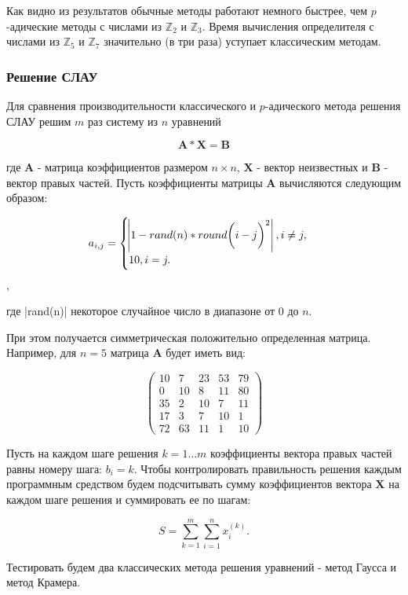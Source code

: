 \documentclass[master, och, diploma, times]{sty/SCWorks}
\theoremstyle{plain}
\theoremstyle{definition}
\begin{document}
Как видно из результатов обычные методы работают немного быстрее, чем $p$-адические методы с числами из $\mathbb{Z}_2$ и $\mathbb{Z}_3$. Время вычисления определителя с числами из $\mathbb{Z}_5$ и $\mathbb{Z}_7$ значительно (в три раза) уступает классическим методам.


\subsubsection{Решение СЛАУ}
Для сравнения производительности классического и $p$-адического метода решения СЛАУ решим $m$ раз систему из $n$ уравнений 

$$
\boldsymbol{A}*\boldsymbol{X}=\boldsymbol{B}
$$

\noindent где $\boldsymbol{A}$ - матрица коэффициентов размером $n \times n$, $\boldsymbol{X}$ - вектор неизвестных и $\boldsymbol{B}$ - вектор правых частей.
Пусть коэффициенты матрицы $\boldsymbol{A}$ вычисляются следующим образом:

$$
a_{i,j}= 
\begin{cases} 
\abs{1-rand(n)*round\bigg(i-j\bigg)^2}, i \neq j, \\ 
10, i = j.
\end{cases}
$$,

\noindent где |rand(n)| некоторое случайное число в диапазоне от $0$ до $n$.

При этом получается симметрическая положительно определенная матрица.
Например, для $n=5$ матрица $\boldsymbol{A}$ будет иметь вид:

$$
\begin{pmatrix}
  10 & 7 & 23 & 53 & 79 \\
  0 & 10 & 8 & 11 & 80 \\
  35 & 2 & 10 & 7 & 11 \\
  17 & 3 & 7 & 10 & 1 \\
  72 & 63 & 11 & 1 & 10
\end{pmatrix}
$$

Пусть на каждом шаге решения $k=1 \dots m$ коэффициенты вектора правых частей равны номеру шага: $b_i = k$.
Чтобы контролировать правильность решения каждым программным средством будем подсчитывать сумму коэффициентов вектора $\boldsymbol{X}$ на каждом шаге решения и суммировать ее по шагам:

$$
S = \sum\limits_{k=1}^{m}\sum\limits_{i=1}^{n} x_i^{(k)}.
$$

Тестировать будем два классических метода решения уравнений - метод Гаусса и метод Крамера.
\end{document}
